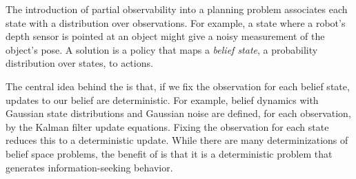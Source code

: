 The introduction of partial observability into a planning problem
associates each state with a distribution over observations. For
example, a state where a robot's depth sensor is pointed at an object
might give a noisy measurement of the object's pose. A solution is a
policy that maps a \emph{belief state}, a probability distribution
over states, to actions.

The central idea behind the \mld{} is that, if we fix the observation
for each belief state, updates to our belief are deterministic. For
example, belief dynamics with Gaussian state distributions and
Gaussian noise are defined, for each observation, by the Kalman filter
update equations. Fixing the observation for each state reduces this
to a deterministic update. While there are many determinizations of
belief space problems, the benefit of \mld{} is that it is a
deterministic problem that generates information-seeking behavior.

